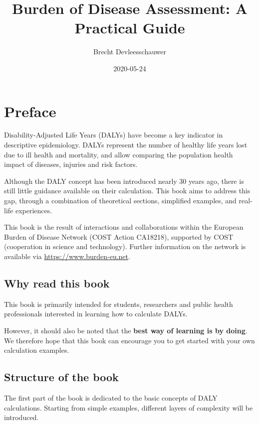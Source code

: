 \documentclass[]{book}
\title{Burden of Disease Assessment: A Practical Guide}
\author{Brecht Devleesschauwer}
\date{2020-05-24}
\begin{document}
\maketitle

{
\setcounter{tocdepth}{1}
\tableofcontents
}
\chapter*{Preface}\label{preface}

Disability-Adjusted Life Years (DALYs) have become a key indicator in
descriptive epidemiology. DALYs represent the number of healthy life
years lost due to ill health and mortality, and allow comparing the
population health impact of diseases, injuries and risk factors.

Although the DALY concept has been introduced nearly 30 years ago, there
is still little guidance available on their calculation. This book aims
to address this gap, through a combination of theoretical sections,
simplified examples, and real-life experiences.

This book is the result of interactions and collaborations within the
European Burden of Disease Network (COST Action CA18218), supported by
COST (cooperation in science and technology). Further information on the
network is available via \url{https://www.burden-eu.net}.

\section*{Why read this book}\label{why-read-this-book}

This book is primarily intended for students, researchers and public
health professionals interested in learning how to calculate DALYs.

However, it should also be noted that the \textbf{best way of learning
is by doing}. We therefore hope that this book can encourage you to get
started with your own calculation examples.

\section*{Structure of the book}\label{structure-of-the-book}

The first part of the book is dedicated to the basic concepts of DALY
calculations. Starting from simple examples, different layers of
complexity will be introduced.
\end{document}
